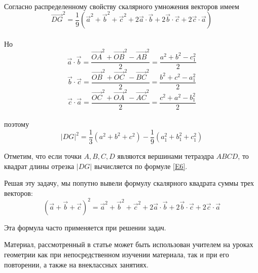 \documentclass{article}
\begin{document}
\\Согласно распределенному свойству скалярного умножения векторов имеем 
$$\overrightarrow{DG}^2=\frac{1}{9}(\overrightarrow{a}^2+\overrightarrow{b}^2+\overrightarrow{c}^2+2\overrightarrow{a}\cdot\overrightarrow{b}+2\overrightarrow{b}\cdot\overrightarrow{c}+2\overrightarrow{c}\cdot\overrightarrow{a})$$
\\Но
$$\overrightarrow{a}\cdot\overrightarrow{b}=\frac{\overrightarrow{OA}^2+\overrightarrow{OB}^2-\overrightarrow{AB}^2}{2}=\frac{a^2+b^2-c_1^2}{2}$$
$$\overrightarrow{b}\cdot\overrightarrow{c}=\frac{\overrightarrow{OB}^2+\overrightarrow{OC}^2-\overrightarrow{BC}^2}{2}=\frac{b^2+c^2-a_1^2}{2}$$
$$\overrightarrow{c}\cdot\overrightarrow{a}=\frac{\overrightarrow{OC}^2+\overrightarrow{OA}^2-\overrightarrow{AC}^2}{2}=\frac{c^2+a^2-b_1^2}{2}$$
\\поэтому
\begin{equation}\label{E6}
|DG|^2=\frac{1}{3}(a^2+b^2+c^2)-\frac{1}{9}(a_1^2+b_1^2+c_1^2)
\end{equation}
\par Отметим, что если точки $A,B,C,D$ являются вершинами тетраэдра $ABCD$, то квадрат длины отрезка $|DG|$ вычисляется по формуле \eqref{E6}.
\par Решая эту задачу, мы попутно вывели формулу скалярного квадрата суммы трех векторов:
$$(\overrightarrow{a}+\overrightarrow{b}+\overrightarrow{c})^2=\overrightarrow{a}^2+\overrightarrow{b}^2+\overrightarrow{c}^2+2\overrightarrow{a}\cdot\overrightarrow{b}+2\overrightarrow{b}\cdot\overrightarrow{c}+2\overrightarrow{c}\cdot\overrightarrow{a}$$
\par Эта формула часто применяется при решении задач.
\par Материал, рассмотренный в статье может быть использован учителем на уроках геометрии как при непосредственном изучении материала, так и при его повторении, а также на внеклассных занятиях.
\end{document}
